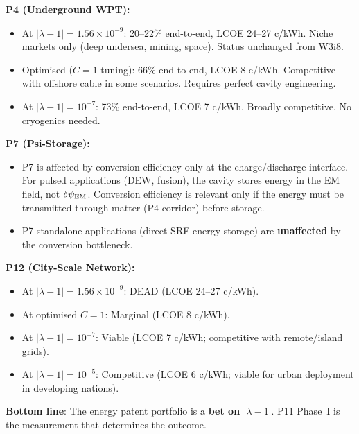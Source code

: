 \documentclass[11pt]{article}
\newcommand{\ee}[1]{\times 10^{#1}}
\newcommand{\dpsiEM}{\delta\psi_{\rm EM}}
\newcommand{\lambdaone}{|\lambda{-}1|}
\begin{document}
\begin{tcolorbox}[colback=yellow!5!white, colframe=yellow!60!black,
  title=\textbf{Patent Portfolio Impact Summary}]

\textbf{P4 (Underground WPT):}
\begin{itemize}[nosep]
\item At $\lambdaone = 1.56\ee{-9}$: 20--22\% end-to-end, LCOE 24--27 c/kWh.
  Niche markets only (deep undersea, mining, space). Status unchanged from W3i8.
\item Optimised ($C = 1$ tuning): 66\% end-to-end, LCOE 8 c/kWh.
  Competitive with offshore cable in some scenarios. Requires perfect
  cavity engineering.
\item At $\lambdaone = 10^{-7}$: 73\% end-to-end, LCOE 7 c/kWh.
  Broadly competitive. No cryogenics needed.
\end{itemize}

\textbf{P7 (Psi-Storage):}
\begin{itemize}[nosep]
\item P7 is affected by conversion efficiency only at the charge/discharge
  interface. For pulsed applications (DEW, fusion), the cavity stores
  energy in the EM field, not $\dpsiEM$. Conversion efficiency is
  relevant only if the energy must be transmitted through matter
  (P4 corridor) before storage.
\item P7 standalone applications (direct SRF energy storage) are
  \textbf{unaffected} by the conversion bottleneck.
\end{itemize}

\textbf{P12 (City-Scale Network):}
\begin{itemize}[nosep]
\item At $\lambdaone = 1.56\ee{-9}$: DEAD (LCOE 24--27 c/kWh).
\item At optimised $C = 1$: Marginal (LCOE 8 c/kWh).
\item At $\lambdaone = 10^{-7}$: Viable (LCOE 7 c/kWh; competitive
  with remote/island grids).
\item At $\lambdaone = 10^{-5}$: Competitive (LCOE 6 c/kWh; viable
  for urban deployment in developing nations).
\end{itemize}

\textbf{Bottom line}: The energy patent portfolio is a \textbf{bet on
$\lambdaone$}. P11 Phase~I is the measurement that determines the
outcome.
\end{tcolorbox}

\end{document}

